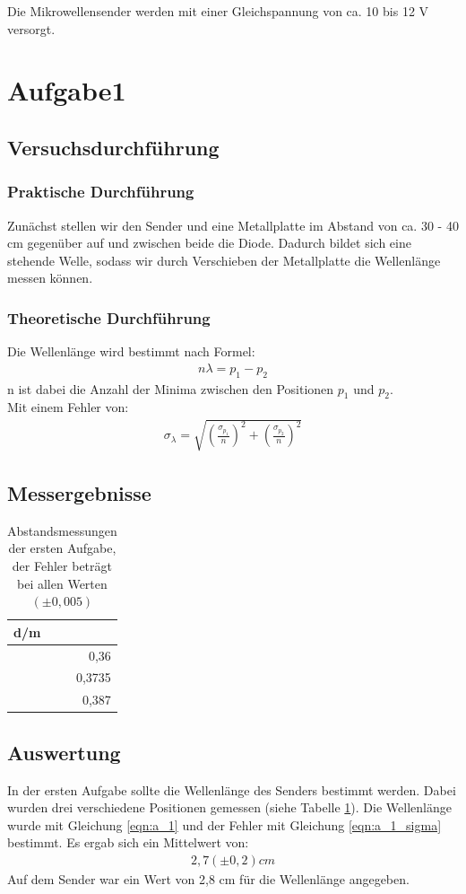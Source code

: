 \documentclass[12pt]{scrartcl}
\begin{document}
Die Mikrowellensender werden mit einer Gleichspannung von ca. 10 bis 12 V versorgt.
\section{Aufgabe1}
\subsection{Versuchsdurchführung}
\subsubsection{Praktische Durchführung}
Zunächst stellen wir den Sender und eine Metallplatte im Abstand von ca. 30 - 40 cm gegenüber auf und zwischen beide die Diode. Dadurch bildet sich eine stehende Welle, sodass wir durch Verschieben der Metallplatte die Wellenlänge messen können.
\subsubsection{Theoretische Durchführung}
Die Wellenlänge wird bestimmt nach Formel:
\begin{align}
n\lambda = p_1 - p_2
\label{eqn:a_1}
\end{align}
n ist dabei die Anzahl der Minima zwischen den Positionen $p_1$ und $p_2$.\\
Mit einem Fehler von:
\begin{align}
\sigma_{\lambda} = \sqrt{
\left(\frac{\sigma_{p_1}}{n}\right)^2+
\left(\frac{\sigma_{p_2}}{n}\right)^2}
\label{eqn:a_1_sigma}
\end{align}
\subsection{Messergebnisse}
\begin{table}[H]
\caption{Abstandsmessungen der ersten Aufgabe, der Fehler beträgt bei allen Werten $(\pm 0,005)$}
\centering
\begin{tabular}{|r|}
\hline
\multicolumn{1}{|l|}{d/m} \\ \hline
0,36 \\ \hline
0,3735 \\ \hline
0,387 \\ \hline
\end{tabular}
\label{tab:a_1}
\end{table}
\subsection{Auswertung}
In der ersten Aufgabe sollte die Wellenlänge des Senders bestimmt werden. Dabei wurden drei verschiedene Positionen gemessen (siehe Tabelle \ref{tab:a_1}). Die Wellenlänge wurde mit Gleichung \ref{eqn:a_1} und der Fehler mit Gleichung \ref{eqn:a_1_sigma} bestimmt. Es ergab sich ein Mittelwert von:
\begin{align*}
2,7 (\pm 0,2) cm
\end{align*}
Auf dem Sender war ein Wert von 2,8 cm für die Wellenlänge angegeben.
\end{document}
